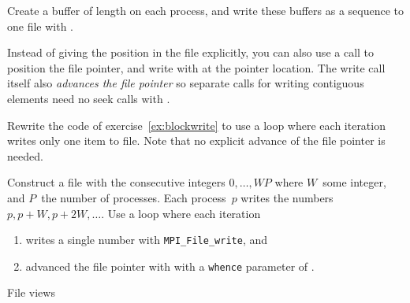 \begin{exercise}
  \label{ex:blockwrite}
  Create a buffer of length  on each process, and write
  these buffers as a sequence to one file with .
\end{exercise}

Instead of giving the position in the file explicitly, you can also
use a  call to position the file pointer,
and write with  at the pointer location.
The write call itself also 
\emph{advances the file pointer}
so separate calls for writing contiguous elements 
need no seek calls with .

\begin{exercise}
  \label{ex:blockadvance}
  Rewrite the code of exercise~\ref{ex:blockwrite} to
  use a loop where each iteration
  writes only one item to file.
  Note that no explicit advance of the file pointer is needed.
\end{exercise}

\begin{exercise}
  \label{ex:blockseek}
  Construct a file with the consecutive integers $0,\ldots,WP$ where
  $W$~some integer, and $P$~the number of processes. Each process~$p$
  writes the numbers $p,p+W,p+2W,\ldots$. Use a loop where each iteration
  \begin{enumerate}
  \item writes a single number with \lstinline{MPI_File_write}, and
  \item advanced the file pointer with 
    with a \lstinline{whence} parameter of
    .
  \end{enumerate}
\end{exercise}

 {File views}

